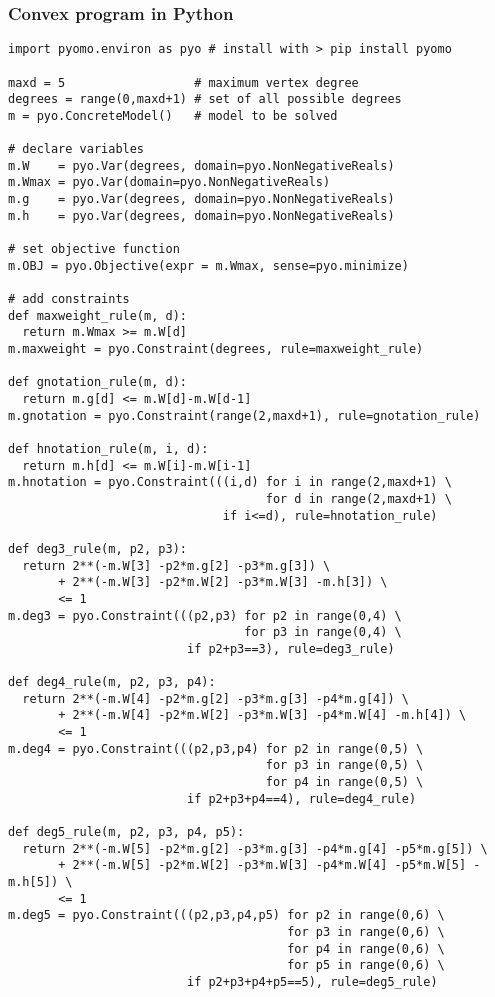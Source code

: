 \begin{frame}
	\frametitle{Convex program in Python}
{\scriptsize
\begin{verbatim}
import pyomo.environ as pyo # install with > pip install pyomo

maxd = 5                  # maximum vertex degree
degrees = range(0,maxd+1) # set of all possible degrees
m = pyo.ConcreteModel()   # model to be solved

# declare variables
m.W    = pyo.Var(degrees, domain=pyo.NonNegativeReals)
m.Wmax = pyo.Var(domain=pyo.NonNegativeReals)
m.g    = pyo.Var(degrees, domain=pyo.NonNegativeReals)
m.h    = pyo.Var(degrees, domain=pyo.NonNegativeReals)

# set objective function
m.OBJ = pyo.Objective(expr = m.Wmax, sense=pyo.minimize)

# add constraints
def maxweight_rule(m, d):
  return m.Wmax >= m.W[d]
m.maxweight = pyo.Constraint(degrees, rule=maxweight_rule)

def gnotation_rule(m, d):
  return m.g[d] <= m.W[d]-m.W[d-1]
m.gnotation = pyo.Constraint(range(2,maxd+1), rule=gnotation_rule)

def hnotation_rule(m, i, d):
  return m.h[d] <= m.W[i]-m.W[i-1]
m.hnotation = pyo.Constraint(((i,d) for i in range(2,maxd+1) \
                                    for d in range(2,maxd+1) \
                              if i<=d), rule=hnotation_rule)

def deg3_rule(m, p2, p3):
  return 2**(-m.W[3] -p2*m.g[2] -p3*m.g[3]) \
       + 2**(-m.W[3] -p2*m.W[2] -p3*m.W[3] -m.h[3]) \
       <= 1
m.deg3 = pyo.Constraint(((p2,p3) for p2 in range(0,4) \
                                 for p3 in range(0,4) \
                         if p2+p3==3), rule=deg3_rule)

def deg4_rule(m, p2, p3, p4):
  return 2**(-m.W[4] -p2*m.g[2] -p3*m.g[3] -p4*m.g[4]) \
       + 2**(-m.W[4] -p2*m.W[2] -p3*m.W[3] -p4*m.W[4] -m.h[4]) \
       <= 1
m.deg4 = pyo.Constraint(((p2,p3,p4) for p2 in range(0,5) \
                                    for p3 in range(0,5) \
                                    for p4 in range(0,5) \
                         if p2+p3+p4==4), rule=deg4_rule)

def deg5_rule(m, p2, p3, p4, p5):
  return 2**(-m.W[5] -p2*m.g[2] -p3*m.g[3] -p4*m.g[4] -p5*m.g[5]) \
       + 2**(-m.W[5] -p2*m.W[2] -p3*m.W[3] -p4*m.W[4] -p5*m.W[5] -m.h[5]) \
       <= 1
m.deg5 = pyo.Constraint(((p2,p3,p4,p5) for p2 in range(0,6) \
                                       for p3 in range(0,6) \
                                       for p4 in range(0,6) \
                                       for p5 in range(0,6) \
                         if p2+p3+p4+p5==5), rule=deg5_rule)


\end{verbatim}}
\end{frame}

